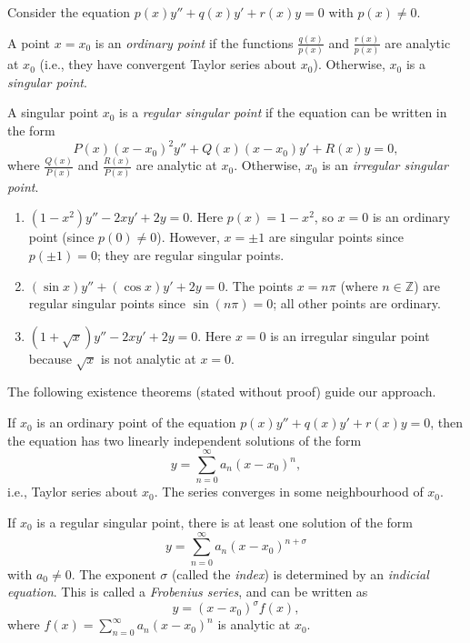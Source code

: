\documentclass[a4paper]{article}
\begin{document}
\begin{defi}
  Consider the equation $p(x) y'' + q(x) y' + r(x) y = 0$ with $p(x) \neq 0$.

  A point $x = x_0$ is an \emph{ordinary point} if the functions $\frac{q(x)}{p(x)}$ and $\frac{r(x)}{p(x)}$ are analytic at $x_0$ (i.e., they have convergent Taylor series about $x_0$). Otherwise, $x_0$ is a \emph{singular point}.

  A singular point $x_0$ is a \emph{regular singular point} if the equation can be written in the form
  \[
    P(x)(x - x_0)^2y'' + Q(x)(x - x_0)y' + R(x)y = 0,
  \]
  where $\frac{Q(x)}{P(x)}$ and $\frac{R(x)}{P(x)}$ are analytic at $x_0$. Otherwise, $x_0$ is an \emph{irregular singular point}.
\end{defi}

\begin{eg}\leavevmode
  \begin{enumerate}
    \item $(1 - x^2)y'' - 2xy' + 2y = 0$. Here $p(x) = 1 - x^2$, so $x = 0$ is an ordinary point (since $p(0) \neq 0$). However, $x = \pm 1$ are singular points since $p(\pm 1) = 0$; they are regular singular points.
    \item $(\sin x) y'' + (\cos x) y' + 2y = 0$. The points $x = n\pi$ (where $n \in \mathbb{Z}$) are regular singular points since $\sin(n\pi) = 0$; all other points are ordinary.
    \item $(1 + \sqrt{x}) y'' - 2xy' + 2y = 0$. Here $x = 0$ is an irregular singular point because $\sqrt{x}$ is not analytic at $x = 0$.
  \end{enumerate}
\end{eg}

\begin{remark}
  The following existence theorems (stated without proof) guide our approach.
\end{remark}

\begin{thm}
  If $x_0$ is an ordinary point of the equation $p(x)y'' + q(x)y' + r(x)y = 0$, then the equation has two linearly independent solutions of the form
  \[
    y = \sum_{n = 0}^\infty a_n(x - x_0)^n,
  \]
  i.e., Taylor series about $x_0$. The series converges in some neighbourhood of $x_0$.
\end{thm}

\begin{thm}
  If $x_0$ is a regular singular point, there is at least one solution of the form
  \[
    y = \sum_{n = 0}^\infty a_n(x - x_0)^{n + \sigma}
  \]
  with $a_0 \neq 0$. The exponent $\sigma$ (called the \emph{index}) is determined by an \emph{indicial equation}. This is called a \emph{Frobenius series}, and can be written as
  \[
    y = (x - x_0)^\sigma f(x),
  \]
  where $f(x) = \sum_{n=0}^{\infty} a_n (x - x_0)^n$ is analytic at $x_0$.
\end{thm}
\end{document}

